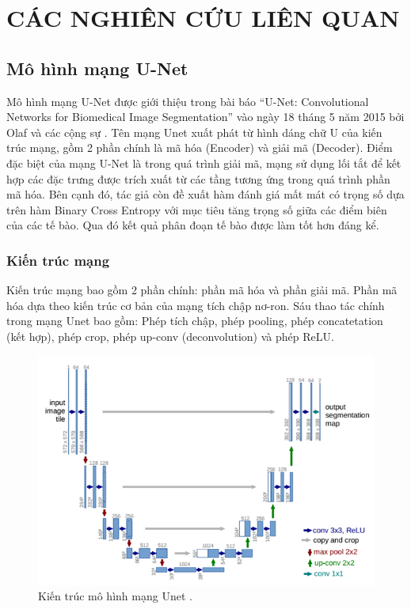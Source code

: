 \chapter{CÁC NGHIÊN CỨU LIÊN QUAN}\label{chapter:related_works}
\section{Mô hình mạng U-Net}
Mô hình mạng U-Net được giới thiệu trong bài báo ``U-Net: Convolutional Networks for Biomedical Image Segmentation'' vào ngày 18 tháng 5 năm 2015 bởi Olaf và các cộng sự \cite{Unet}. Tên mạng Unet xuất phát từ hình dáng chữ U của kiến trúc mạng, gồm 2 phần chính là mã hóa (Encoder) và giải mã (Decoder). Điểm đặc biệt của mạng U-Net là trong quá trình giải mã, mạng sử dụng lối tắt để kết hợp các đặc trưng được trích xuất từ các tầng tương ứng trong quá trình phần mã hóa. Bên cạnh đó, tác giả còn đề xuất hàm đánh giá mất mát có trọng số dựa trên hàm Binary Cross Entropy với mục tiêu tăng trọng số giữa các điểm biên của các tế bào. Qua đó kết quả phân đoạn tế bào được làm tốt hơn đáng kể.

\subsection{Kiến trúc mạng}
Kiến trúc mạng bao gồm 2 phần chính: phần mã hóa và phần giải mã. Phần mã hóa dựa theo kiến trúc cơ bản của mạng tích chập nơ-ron. Sáu thao tác chính trong mạng Unet bao gồm: Phép tích chập, phép pooling, phép concatetation (kết hợp), phép crop, phép up-conv (deconvolution) và phép ReLU.

\begin{figure}[H]
    \centering
    \includegraphics[width=14cm]{images/medicine/img3.png}
    \caption{Kiến trúc mô hình mạng Unet \cite{Unet}.}
\end{figure}

